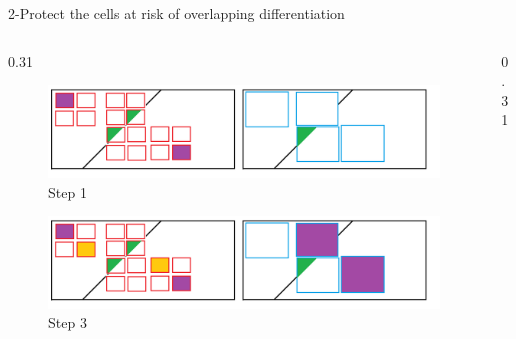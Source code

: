 \documentclass[final,xcolor={dvipsnames,svgnames,table}]{beamer}
\newlength{\colwidth}
\begin{document}
\begin{frame}[fragile,t]
\begin{columns}[t]
\begin{column}{\colwidth}
\begin{block}{2-Protect the cells at risk of overlapping differentiation}
\begin{columns}
    \begin{column}{0.31\colwidth}
        \vspace{-1cm}
        \begin{figure}
            \centering
            \caption{\footnotesize Step 1}
            \vspace{-1cm}
            \includegraphics[scale=0.35]{Images/test_articulation_2.png}
        \end{figure}
        \vspace{-1cm}
        \setcounter{figure}{7}
        \begin{figure}
            \centering
            \caption{\footnotesize Step 3}
             \vspace{-1cm}
            \includegraphics[scale=0.35]{Images/test_articulation_5.png}
        \end{figure}
    \end{column}

    \hfill
    
    \begin{column}{0.31\colwidth}
        

\end{column}
\end{columns}
\end{block}
\end{column}
\end{columns}
\end{frame}
\end{document}
